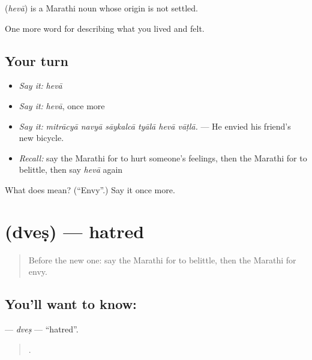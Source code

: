 \begin{cousinweb}
\textbf{} (\emph{hevā}) is a Marathi noun whose origin is not settled.
\end{cousinweb}

\begin{grammarlens}[title={What you've built}]
One more word for describing what you lived and felt.
\end{grammarlens}

\subsection*{Your turn}
\begin{itemize}
\raggedright
  \item \emph{Say it:} \emph{hevā}
  \item \emph{Say it:} \emph{hevā}, once more
  \item \emph{Say it:} \emph{mitrācyā navyā sāykalcā tyālā hevā vāṭlā.} — He envied his friend's new bicycle.
  \item \emph{Recall:} say the Marathi for to hurt someone's feelings, then the Marathi for to belittle, then say \emph{hevā} again
\end{itemize}

\begin{tcolorbox}[breakable,colback=teal!4,colframe=teal!35!black,title={Before you move on}]
What does  mean? (\textquotedblleft{}Envy\textquotedblright{}.) Say it once more.
\end{tcolorbox}
\section[\texorpdfstring{\mr{द्वेष} (dveṣ)}{द्वेष (dveṣ)}]{ (dveṣ) — hatred}

\label{lesson:MR-C462-dves}



\begin{quote}
Before the new one: say the Marathi for to belittle, then the Marathi for envy.
\end{quote}

\subsection*{You'll want to know: }
\textbf{} — \emph{dveṣ} — \textquotedblleft{}hatred\textquotedblright{}.

\begin{quote}
   .
\end{quote}


